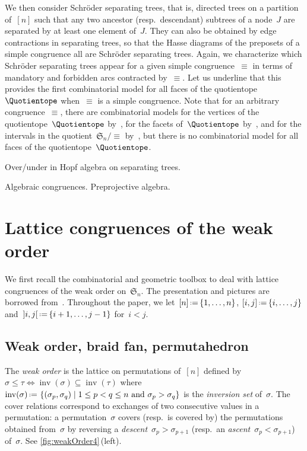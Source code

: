 \documentclass{amsart}
\theoremstyle{definition}
\newcommand{\f}[1]{{\mathfrak{#1}}} %
\newcommand{\set}[2]{\left\{ #1 \;\middle|\; #2 \right\}} %
\newcommand{\eqdef}{\mbox{\,\raisebox{0.2ex}{\scriptsize\ensuremath{\mathrm:}}\ensuremath{=}\,}} %
\DeclareMathOperator{\inv}{inv} %
\newcommand{\darkblue}{\color{darkblue}} %
\newcommand{\defn}[1]{\textsl{\darkblue #1}} %
\begin{document}
We then consider Schröder separating trees, that is, directed trees on a partition of~$[n]$ such that any two ancestor (resp.~descendant) subtrees of a node~$J$ are separated by at least one element of~$J$. 
They can also be obtained by edge contractions in separating trees, so that the Hasse diagrams of the preposets of a simple congruence all are Schröder separating trees.
Again, we characterize which Schröder separating trees appear for a given simple congruence~$\equiv$ in terms of mandatory and forbidden arcs contracted by~$\equiv$.
Let us underline that this provides the first combinatorial model for all faces of the quotientope~$\Quotientope$ when~$\equiv$ is a simple congruence.
Note that for an arbitrary congruence~$\equiv$, there are combinatorial models for the vertices of the quotientope~$\Quotientope$ by~\cite{Reading-arcDiagrams}, for the facets of~$\Quotientope$ by~\cite{AlbertinPilaudRitter}, and for the intervals in the quotient~$\f{S}_n/{\equiv}$ by~\cite{AlbertinPilaud}, but there is no combinatorial model for all faces of the quotientope~$\Quotientope$.

Over/under in Hopf algebra on separating trees.

Algebraic congruences. Preprojective algebra.


\clearpage
\section{Lattice congruences of the weak order}
\label{sec:latticeCongruences}

We first recall the combinatorial and geometric toolbox to deal with lattice congruences of the weak order on~$\f{S}_n$.
The presentation and pictures are borrowed from~\cite{PilaudSantos-quotientopes, PadrolPilaudRitter}.
Throughout the paper, we let~$[n] \eqdef \{1, \dots, n\}$, $[i,j] \eqdef \{i, \dots, j\}$ and~${{]i,j[} \eqdef \{i+1, \dots, j-1\}}$ for~$i < j$.


\subsection{Weak order, braid fan, permutahedron}
\label{subsec:weakOrder}

The \defn{weak order} is the lattice on permutations of~$[n]$ defined by ${\sigma \le \tau \iff \inv(\sigma) \subseteq \inv(\tau)}$ where~$\inv(\sigma) \eqdef \set{(\sigma_p, \sigma_q)}{1 \le p < q \le n \text{ and } \sigma_p > \sigma_q}$ is the \defn{inversion set} of~$\sigma$.
The cover relations correspond to exchanges of two consecutive values in a permutation: a permutation~$\sigma$ covers (resp.~is covered by) the permutations obtained from~$\sigma$ by reversing a \defn{descent}~$\sigma_p > \sigma_{p+1}$ (resp.~an \defn{ascent}~$\sigma_p < \sigma_{p+1}$) of~$\sigma$.
See \cref{fig:weakOrder4}\,(left).
\end{document}

